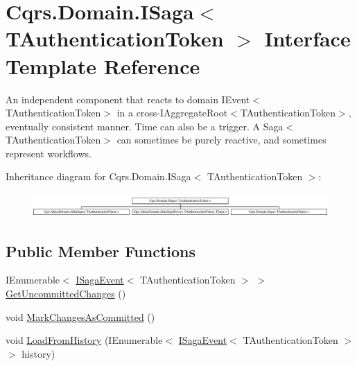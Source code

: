\hypertarget{interfaceCqrs_1_1Domain_1_1ISaga}{}\section{Cqrs.\+Domain.\+I\+Saga$<$ T\+Authentication\+Token $>$ Interface Template Reference}
\label{interfaceCqrs_1_1Domain_1_1ISaga}


An independent component that reacts to domain I\+Event$<$\+T\+Authentication\+Token$>$ in a cross-\/I\+Aggregate\+Root$<$\+T\+Authentication\+Token$>$, eventually consistent manner. Time can also be a trigger. A Saga$<$\+T\+Authentication\+Token$>$ can sometimes be purely reactive, and sometimes represent workflows.  


Inheritance diagram for Cqrs.\+Domain.\+I\+Saga$<$ T\+Authentication\+Token $>$\+:\begin{figure}[H]
\begin{center}
\leavevmode
\includegraphics[height=0.915033cm]{interfaceCqrs_1_1Domain_1_1ISaga}
\end{center}
\end{figure}
\subsection*{Public Member Functions}
\begin{DoxyCompactItemize}
\item 
I\+Enumerable$<$ \hyperlink{interfaceCqrs_1_1Events_1_1ISagaEvent}{I\+Saga\+Event}$<$ T\+Authentication\+Token $>$ $>$ \hyperlink{interfaceCqrs_1_1Domain_1_1ISaga_abb77811b4f7d19adb61f9d33da18e7e0_abb77811b4f7d19adb61f9d33da18e7e0}{Get\+Uncommitted\+Changes} ()
\item 
void \hyperlink{interfaceCqrs_1_1Domain_1_1ISaga_a85c75f80bc5be4bad7f1d9f1231bfba7_a85c75f80bc5be4bad7f1d9f1231bfba7}{Mark\+Changes\+As\+Committed} ()
\item 
void \hyperlink{interfaceCqrs_1_1Domain_1_1ISaga_a2714804684bc65cf4dec79b4697b9b21_a2714804684bc65cf4dec79b4697b9b21}{Load\+From\+History} (I\+Enumerable$<$ \hyperlink{interfaceCqrs_1_1Events_1_1ISagaEvent}{I\+Saga\+Event}$<$ T\+Authentication\+Token $>$$>$ history)
\end{DoxyCompactItemize}
